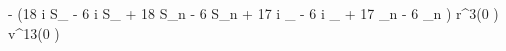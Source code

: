 -  \left(18 i S_{\lambda} \nu - 6 i S_{\lambda} + 18 S_{n} \nu - 6 S_{n} + 17 i \Sigma_{\lambda} \delta \nu - 6 i \Sigma_{\lambda} \delta + 17 \Sigma_{n} \delta \nu - 6 \Sigma_{n} \delta\right) r^{3}{\left (0 \right )} v^{13}{\left (0 \right )}